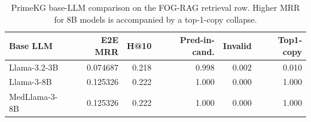 \begin{table}[t]
\centering
\small
\begin{tabular}{lrrrrr}
\hline
Base LLM & E2E MRR & H@10 & Pred-in-cand. & Invalid & Top1-copy \\
\hline
Llama-3.2-3B & 0.074687 & 0.218 & 0.998 & 0.002 & 0.010 \\
Llama-3-8B & 0.125326 & 0.222 & 1.000 & 0.000 & 1.000 \\
MedLlama-3-8B & 0.125326 & 0.222 & 1.000 & 0.000 & 1.000 \\
\hline
\end{tabular}
\caption{PrimeKG base-LLM comparison on the FOG-RAG retrieval row. Higher MRR for 8B models is accompanied by a top-1-copy collapse.}
\label{tab:primekg-model-comparison}
\end{table}
